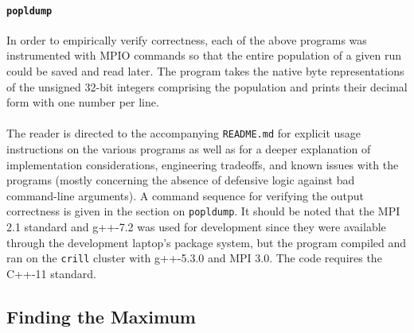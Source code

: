 \documentclass[11pt,epsf]{article}
\begin{document}
{{    \paragraph{\texttt{popldump}}{
      In order to empirically verify correctness, each of the above programs
      was instrumented with MPIO\autocite{MPIO} commands so that the
      entire population of a given run could be saved and read later.
      The program takes the native byte representations of the unsigned
      32-bit integers comprising the population and prints their decimal
      form with one number per line.
    }
    \paragraph{}{
      The reader is directed to the accompanying \texttt{README.md} for
      explicit usage instructions on the various programs as well as
      for a deeper explanation of implementation considerations,
      engineering tradeoffs, and known issues with the programs (mostly
      concerning the absence of defensive logic against bad command-line
      arguments). A command sequence for verifying the output correctness
      is given in the section on \texttt{popldump}. It should be noted
      that the MPI 2.1 standard\autocite{MPI21} and g++-7.2 was used for
      development since they were available through the development laptop's
      package system, but the program compiled and ran on the \texttt{crill}
      cluster with g++-5.3.0 and MPI 3.0. The code requires the C++-11 standard.
    }
  }
  \subsection{Finding the Maximum}{
}}
\end{document}
